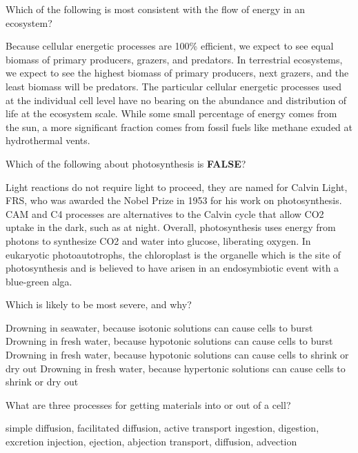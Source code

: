 \documentclass[exam,addpoints,noanswers]{exam}
\begin{document}
\begin{questions}
\question[1] Which of the following is most consistent with the flow of energy in an ecosystem?
\begin{choices}
\choice Because cellular energetic processes are 100\% efficient, we expect to see equal biomass of primary producers, grazers, and predators.
\CorrectChoice In terrestrial ecosystems, we expect to see the highest biomass of primary producers, next grazers, and the least biomass will be predators.
\choice The particular cellular energetic processes used at the individual cell level have no bearing on the abundance and distribution of life at the ecosystem scale. 
\choice While some small percentage of energy comes from the sun, a more significant fraction comes from fossil fuels like methane exuded at hydrothermal vents. 
\end{choices}

\question[1] Which of the following about photosynthesis is \textbf{FALSE}?
\begin{choices}
\CorrectChoice Light reactions do not require light to proceed, they are named for Calvin Light, FRS, who was awarded the Nobel Prize in 1953 for his work on photosynthesis.
\choice CAM and C4 processes are alternatives to the Calvin cycle that allow CO2 uptake in the dark, such as at night. 
\choice Overall, photosynthesis uses energy from photons to synthesize CO2 and water into glucose, liberating oxygen. 
\choice In eukaryotic photoautotrophs, the chloroplast is the organelle which is the site of photosynthesis and is believed to have arisen in an endosymbiotic event with a blue-green alga. 
\end{choices}

\question[1] Which is likely to be most severe, and why?
\begin{choices}
\choice Drowning in seawater, because isotonic solutions can cause cells to burst
\CorrectChoice Drowning in fresh water, because hypotonic solutions can cause cells to burst
\choice Drowning in fresh water, because hypotonic solutions can cause cells to shrink or dry out
\choice Drowning in fresh water, because  hypertonic solutions can cause cells to shrink or dry out
\end{choices}

\question[1] What are three processes for getting materials into or out of a cell?
\begin{choices}
\CorrectChoice simple diffusion, facilitated diffusion, active transport
\choice ingestion, digestion, excretion
\choice injection, ejection, abjection
\choice transport, diffusion, advection
\end{choices}






\end{questions}
\end{document}
